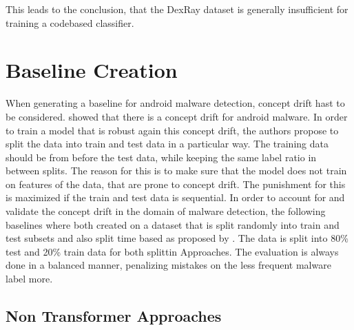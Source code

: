 This leads to the conclusion, that the DexRay dataset is generally insufficient for training a codebased classifier.


\section{Baseline Creation}

When generating a baseline for android malware detection, concept drift hast to be considered.
\cite{transcend} showed that there is a concept drift for android malware.
In order to train a model that is robust again this concept drift, 
the authors propose to split the data into train and test data in a particular way.
The training data should be from before the test data, 
while keeping the same label ratio in between splits.  
The reason for this is to make sure that the model does not train on features of the data, 
that are prone to concept drift.
The punishment for this is maximized if the train and test data is sequential.
In order to account for and validate the concept drift in the domain of malware detection,
the following baselines where both created on a dataset that is split randomly into train and test subsets
and also split time based as proposed by \cite{transcend}.
The data is split into 80\% test and 20\% train data for both splittin Approaches.
The evaluation is always done in a balanced manner, penalizing mistakes on the less frequent malware label more.

\subsection{Non Transformer Approaches}

